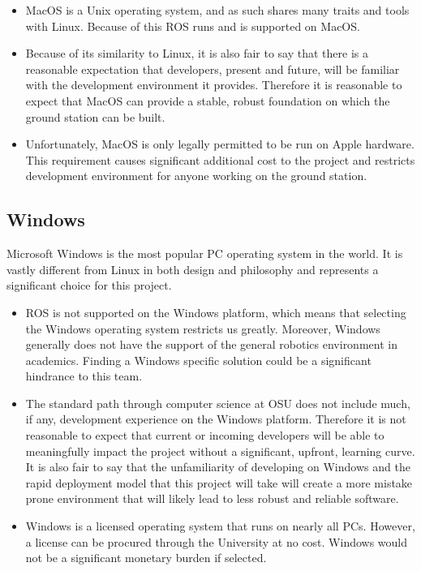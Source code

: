 \documentclass[onecolumn, draftclsnofoot, 10pt, compsoc]{IEEEtran}
\begin{document}
\begin{itemize}
\item 
MacOS is a Unix operating system, and as such shares many traits and tools with Linux.
Because of this ROS runs and is supported on MacOS.

\item
Because of its similarity to Linux, it is also fair to say that there is a reasonable expectation that developers, present and future, will be familiar with the development environment it provides.
Therefore it is reasonable to expect that MacOS can provide a stable, robust foundation on which the ground station can be built.

\item
Unfortunately, MacOS is only legally permitted to be run on Apple hardware.
This requirement causes significant additional cost to the project and restricts development environment for anyone working on the ground station.

\end{itemize}

\subsection{Windows}
Microsoft Windows is the most popular PC operating system in the world.
It is vastly different from Linux in both design and philosophy and represents a significant choice for this project.

\begin{itemize}
\item 
ROS is not supported on the Windows platform, which means that selecting the Windows operating system restricts us greatly.
Moreover, Windows generally does not have the support of the general robotics environment in academics.
Finding a Windows specific solution could be a significant hindrance to this team.

\item
The standard path through computer science at OSU does not include much, if any, development experience on the Windows platform.
Therefore it is not reasonable to expect that current or incoming developers will be able to meaningfully impact the project without a significant, upfront, learning curve.
It is also fair to say that the unfamiliarity of developing on Windows and the rapid deployment model that this project will take will create a more mistake prone environment that will likely lead to less robust and reliable software.

\item
Windows is a licensed operating system that runs on nearly all PCs.
However, a license can be procured through the University at no cost.
Windows would not be a significant monetary burden if selected.

\end{itemize}
\end{document}
